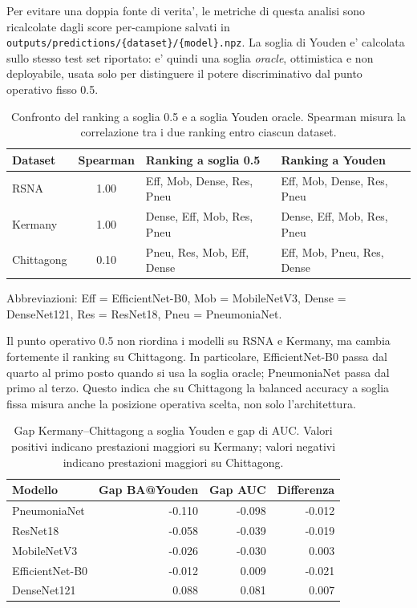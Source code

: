 \documentclass[11pt,a4paper]{article}
\newcommand{\balacc}{balanced accuracy}
\begin{document}
Per evitare una doppia fonte di verita', le metriche di questa analisi sono
ricalcolate dagli score per-campione salvati in
\texttt{outputs/predictions/\{dataset\}/\{model\}.npz}. La soglia di Youden e'
calcolata sullo stesso test set riportato: e' quindi una soglia
\emph{oracle}, ottimistica e non deployabile, usata solo per distinguere il
potere discriminativo dal punto operativo fisso 0.5.

\begin{table}[H]
\centering
\caption{Confronto del ranking a soglia 0.5 e a soglia Youden oracle. Spearman misura la correlazione tra i due ranking entro ciascun dataset.}
\label{tab:threshold-ranking}
\small
\begin{tabular}{lcll}
\toprule
Dataset & Spearman & Ranking a soglia 0.5 & Ranking a Youden \\
\midrule
RSNA & 1.00 & Eff, Mob, Dense, Res, Pneu & Eff, Mob, Dense, Res, Pneu \\
Kermany & 1.00 & Dense, Eff, Mob, Res, Pneu & Dense, Eff, Mob, Res, Pneu \\
Chittagong & 0.10 & Pneu, Res, Mob, Eff, Dense & Eff, Mob, Pneu, Res, Dense \\
\bottomrule
\end{tabular}
\vspace{0.2em}

\footnotesize{Abbreviazioni: Eff = EfficientNet-B0, Mob = MobileNetV3, Dense = DenseNet121, Res = ResNet18, Pneu = PneumoniaNet.}
\end{table}
\normalsize

Il punto operativo 0.5 non riordina i modelli su RSNA e Kermany, ma cambia
fortemente il ranking su Chittagong. In particolare, EfficientNet-B0 passa dal
quarto al primo posto quando si usa la soglia oracle; PneumoniaNet passa dal
primo al terzo. Questo indica che su Chittagong la \balacc{} a soglia fissa
misura anche la posizione operativa scelta, non solo l'architettura.

\begin{table}[H]
\centering
\caption{Gap Kermany--Chittagong a soglia Youden e gap di AUC. Valori positivi indicano prestazioni maggiori su Kermany; valori negativi indicano prestazioni maggiori su Chittagong.}
\label{tab:threshold-gap}
\begin{tabular}{lrrr}
\toprule
Modello & Gap BA@Youden & Gap AUC & Differenza \\
\midrule
PneumoniaNet & -0.110 & -0.098 & -0.012 \\
ResNet18 & -0.058 & -0.039 & -0.019 \\
MobileNetV3 & -0.026 & -0.030 & 0.003 \\
EfficientNet-B0 & -0.012 & 0.009 & -0.021 \\
DenseNet121 & 0.088 & 0.081 & 0.007 \\
\bottomrule
\end{tabular}
\end{table}
\end{document}
